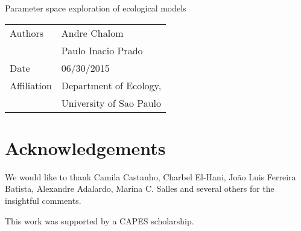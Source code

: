 \documentclass[twoside,12pt,a4paper]{article}
\begin{document}

\begin{center}
  {\Large Parameter space exploration of ecological models}

\begin{table}[hbt]{\small
\begin{tabular}{ll}
Authors        & Andre Chalom \\
               & Paulo Inacio Prado \\
Date           & 06/30/2015 \\
Affiliation    & Department of Ecology, \\
	       & University of Sao Paulo 
\end{tabular} }
\end{table}
\end{center}

\mbox{}\vspace{-14mm}\mbox{}



\newpage
\tableofcontents
\newpage






\newpage


\section*{Acknowledgements}
We would like to thank Camila Castanho, Charbel El-Hani, Jo\~ao Luis Ferreira Batista, Alexandre Adalardo,
Marina C. Salles and several others for the insightful comments.

This work was supported by a CAPES scholarship.

\newpage


\end{document}
